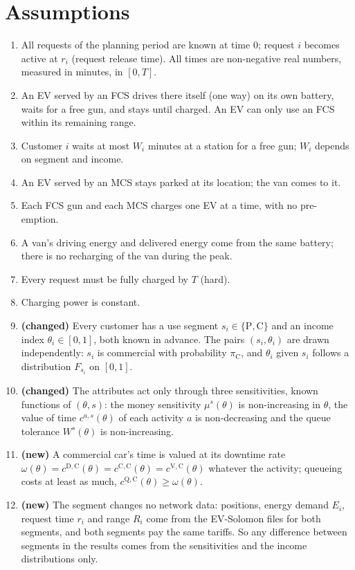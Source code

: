 \documentclass[12pt,a4paper]{article}
\begin{document}
\section{Assumptions}
\begin{enumerate}[itemsep=2pt]
  \item All requests of the planning period are known at time 0; request $i$ becomes active at $r_i$ (request release time). All times are non-negative real numbers, measured in minutes, in $[0,T]$.
  \item An EV served by an FCS drives there itself (one way) on its own battery, waits for a free gun, and stays until charged. An EV can only use an FCS within its remaining range.
  \item Customer $i$ waits at most $W_i$ minutes at a station for a free gun; $W_i$ depends on segment and income.
  \item An EV served by an MCS stays parked at its location; the van comes to it.
  \item Each FCS gun and each MCS charges one EV at a time, with no pre-emption.
  \item A van's driving energy and delivered energy come from the same battery; there is no recharging of the van during the peak.
  \item Every request must be fully charged by $T$ (hard).
  \item Charging power is constant.
  \item \textbf{(changed)} Every customer has a use segment $s_i\in\{\mathrm P,\mathrm C\}$ and an income index $\theta_i\in[0,1]$, both known in advance. The pairs $(s_i,\theta_i)$ are drawn independently: $s_i$ is commercial with probability $\pi_{\mathrm C}$, and $\theta_i$ given $s_i$ follows a distribution $F_{s_i}$ on $[0,1]$.
  \item \textbf{(changed)} The attributes act only through three sensitivities, known functions of $(\theta,s)$: the money sensitivity $\mu^{s}(\theta)$ is non-increasing in $\theta$, the value of time $c^{a,s}(\theta)$ of each activity $a$ is non-decreasing and the queue tolerance $W^{s}(\theta)$ is non-increasing.
  \item \textbf{(new)} A commercial car's time is valued at its downtime rate $\omega(\theta)=c^{\mathrm D,\mathrm C}(\theta)=c^{\mathrm C,\mathrm C}(\theta)=c^{\mathrm V,\mathrm C}(\theta)$ whatever the activity; queueing costs at least as much, $c^{\mathrm Q,\mathrm C}(\theta)\ge\omega(\theta)$.
  \item \textbf{(new)} The segment changes no network data: positions, energy demand $E_i$, request time $r_i$ and range $R_i$ come from the EV-Solomon files for both segments, and both segments pay the same tariffs. So any difference between segments in the results comes from the sensitivities and the income distributions only.

\end{enumerate}
\end{document}
